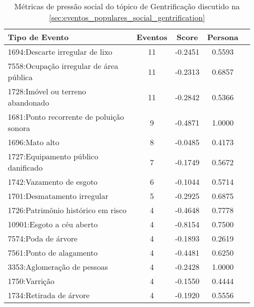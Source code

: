 \begin{table}[htbp]
	\centering
	\caption{Métricas de pressão social do tópico de Gentrificação discutido na \autoref{sec:eventos_populares_social_gentrification}}
	\label{tab:eventos_populares_social_gentrification}
	\begin{tabular}{|l|c|c|c|c|}
		\hline
		\textbf{Tipo de Evento}                  & \textbf{Eventos} & \textbf{Score} & \textbf{Persona} \\
		\hline
		1694:Descarte irregular de lixo          & 11               & -0.2451        & 0.5593           \\
		\hline
		7558:Ocupação irregular de área pública  & 11               & -0.2313        & 0.6857           \\
		\hline
		1728:Imóvel ou terreno abandonado        & 11               & -0.2842        & 0.5366           \\
		\hline
		1681:Ponto recorrente de poluição sonora & 9                & -0.4871        & 1.0000           \\
		\hline
		1696:Mato alto                           & 8                & -0.0485        & 0.4173           \\
		\hline
		1727:Equipamento público danificado      & 7                & -0.1749        & 0.5672           \\
		\hline
		1742:Vazamento de esgoto                 & 6                & -0.1044        & 0.5714           \\
		\hline
		1701:Desmatamento irregular              & 5                & -0.2925        & 0.6875           \\
		\hline
		1726:Patrimônio histórico em risco       & 4                & -0.4648        & 0.7778           \\
		\hline
		10901:Esgoto a céu aberto                & 4                & -0.8154        & 0.7500           \\
		\hline
		7574:Poda de árvore                      & 4                & -0.1893        & 0.2619           \\
		\hline
		7561:Ponto de alagamento                 & 4                & -0.4481        & 0.6250           \\
		\hline
		3353:Aglomeração de pessoas              & 4                & -0.2428        & 1.0000           \\
		\hline
		1750:Varrição                            & 4                & -0.1550        & 0.4444           \\
		\hline
		1734:Retirada de árvore                  & 4                & -0.1920        & 0.5556           \\

\end{tabular}
\end{table}

